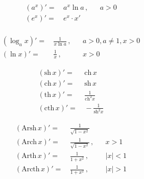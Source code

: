 \begin{center}
\begin{multicols}{2}
    \begin{align*}
        (a^x)' =&\,a^x \ln a\,,&&a>0\\
        (e^x)' =&\,e^x \cdot x'\\
    \end{align*}

    \columnbreak

    \begin{align*}
        (\log_a x)' =&\,\frac{1}{x\ln a}\,,&&a > 0, a \neq 1, x > 0\\
        (\ln x)' =&\,\frac{1}{x}\,,&&x > 0
    \end{align*}
\end{multicols}


\begin{multicols}{2}
    \begin{align*}
        (\text{sh}\, x)' =&\,\text{ch}\, x\\
        (\text{ch}\, x)' =&\,\text{sh}\, x\\
        (\text{th}\, x)' =&\,\frac{1}{\text{ch}^2 x}\\
        (\text{cth}\, x)'=&\,-\frac{1}{\text{sh}^2 x}
    \end{align*}

    \columnbreak

    \begin{align*}
        (\text{Arsh}\, x)' =&\,\frac{1}{\sqrt{1 - x^2}}\\
        (\text{Arch}\, x)' =&\,\frac{1}{\sqrt{1 - x^2}}\,,&&x > 1\\
        (\text{Arth}\, x)' =&\,\frac{1}{1+x^2}\,,&&|x| < 1\\
        (\text{Arcth}\, x)'=&\,\frac{1}{1+x^2}\,,&&|x| > 1
    \end{align*}
\end{multicols}


\end{center}
